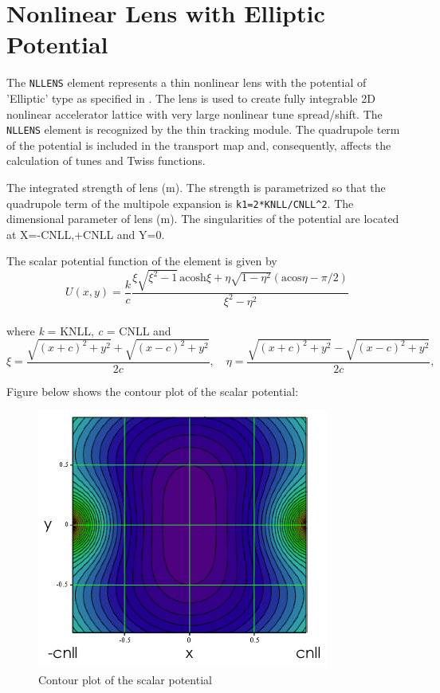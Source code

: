 \section{Nonlinear Lens with Elliptic Potential}
\label{sec:nllens}


The \texttt{NLLENS} element represents a thin nonlinear lens with the potential
of 'Elliptic' type as specified in \cite{danilov2010}. The lens is used
to create fully integrable 2D nonlinear accelerator lattice with very
large nonlinear tune spread/shift. The \texttt{NLLENS} element is recognized by
the thin tracking module. The quadrupole term of the potential is
included in the transport map and, consequently, affects the calculation
of tunes and Twiss functions.

\begin{madlist}
    The integrated strength of lens (m). The strength is
     parametrized so that the quadrupole term of the multipole
     expansion is \texttt{k1=2*KNLL/CNLL\textasciicircum2}.
    The dimensional parameter of lens (m). The singularities
     of the potential are located at X=-CNLL,+CNLL and Y=0.
\end{madlist}

The scalar potential function of the element is given by
\begin{equation}
U(x,y)=\frac{k}{c}\frac{\xi\sqrt{\xi^2-1} \, \text{acosh}\xi +
  \eta\sqrt{1-\eta^2}(\text{acos}\eta-\pi/2)}{\xi^2-\eta^2}
\end{equation}
\\ where \textit{k} = KNLL, \textit{c} = CNLL and
\begin{equation}
\xi = \frac{\sqrt{(x+c)^2+y^2}+\sqrt{(x-c)^2+y^2}}{2c},
\quad \eta = \frac{\sqrt{(x+c)^2+y^2}-\sqrt{(x-c)^2+y^2}}{2c},
\end{equation}

Figure below shows the contour plot of the scalar potential: \\
\begin{figure}
  \centering
  \includegraphics[width=220bp]{jpg/nllens_potential-2D.jpg}
  \caption{Contour plot of the scalar potential}
  \label{fig:nllens-potential}
\end{figure}

